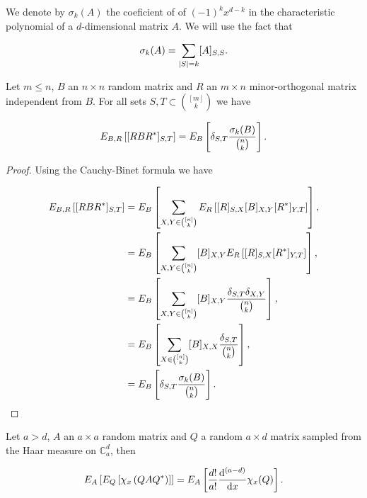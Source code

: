 

We denote by $\sigma_k(A)$ the coeficient of of $(-1)^{k}x^{d-k}$ in the characteristic polynomial of a $d$-dimensional matrix $A$. We will use the fact that 

\begin{equation*}
    \sigma_k(A) = \sum_{\lvert S \rvert = k} [A]_{S,S}.
\end{equation*}

\begin{lemma} \label{lemma:conjugate_minorth}
    Let $m \le n$, $B$ an $n\times n$ random matrix and $R$ an $m\times n$ minor-orthogonal matrix independent from $B$. For all sets $S,T \subset \binom{[m]}{k}$ we have

    \begin{equation*}
        E_{B,R} \left[ [RBR^*]_{S,T} \right] = E_B \left[\delta_{S,T} \frac{\sigma_k(B)}{\binom{n}k}\right].
    \end{equation*}
\end{lemma}

\begin{proof}
    Using the Cauchy-Binet formula we have

    \begin{align*}
        E_{B,R} \left[ [RBR^*]_{S,T} \right] &= E_B \left[\sum_{X,Y \in \binom{[n]}{k}} E_R \left[ [R]_{S,X} [B]_{X,Y} [R^*]_{Y,T} \right] \right],\\ 
        &= E_B \left[\sum_{X,Y \in \binom{[n]}{k}} [B]_{X,Y} E_R \left[ [R]_{S,X} [R^*]_{Y,T} \right] \right],\\ 
        &=  E_B \left[\sum_{X,Y \in \binom{[n]}{k}} [B]_{X,Y} \frac{\delta_{S,T} \delta_{X,Y}}{\binom{n}{k}} \right],\\ 
        &= E_B \left[\sum_{X \in \binom{[n]}{k}} [B]_{X,X} \frac{\delta_{S,T}}{\binom{n}{k}} \right],\\
        &= E_B \left[\delta_{S,T} \frac{\sigma_k(B)}{\binom{n}k}\right].
    \end{align*}
\end{proof}


\begin{lemma}
    Let $a > d$, $A$ an $a \times a$ random matrix and $Q$ a random $a \times d$ matrix sampled from the Haar measure on $\mathbb C_a^d$, then

    \begin{equation*}
        E_A \left[E_Q\left[ \chi_x \left( Q A Q^* \right) \right]\right] = E_A \left[\frac{d!}{a!} \frac{\mathrm d^{(a-d)}}{\mathrm d x} \chi_x(Q) \right].
    \end{equation*}
\end{lemma}

